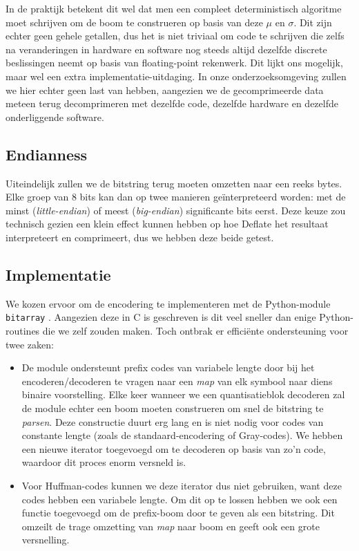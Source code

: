 \begin{itemize}
In de praktijk betekent dit wel dat men een compleet deterministisch algoritme moet schrijven om de boom te construeren op basis van deze $\mu$ en $\sigma$. Dit zijn echter geen gehele getallen, dus het is niet triviaal om code te schrijven die zelfs na veranderingen in hardware en software nog steeds altijd dezelfde discrete beslissingen neemt op basis van floating-point rekenwerk. Dit lijkt ons mogelijk, maar wel een extra implementatie-uitdaging. In onze onderzoeksomgeving zullen we hier echter geen last van hebben, aangezien we de gecomprimeerde data meteen terug decomprimeren met dezelfde code, dezelfde hardware en dezelfde onderliggende software.

\end{itemize}

\subsection{Endianness}

Uiteindelijk zullen we de bitstring terug moeten omzetten naar een reeks bytes. Elke groep van 8 bits kan dan op twee manieren ge\"interpreteerd worden: met de minst (\textit{little-endian}) of meest (\textit{big-endian}) significante bits eerst. Deze keuze zou technisch gezien een klein effect kunnen hebben op hoe Deflate het resultaat interpreteert en comprimeert, dus we hebben deze beide getest.

\subsection{Implementatie}

We kozen ervoor om de encodering te implementeren met de Python-module \texttt{bitarray} \cite{ref:bitarray}. Aangezien deze in C is geschreven is dit veel sneller dan enige Python-routines die we zelf zouden maken. Toch ontbrak er effici\"ente ondersteuning voor twee zaken:

\begin{itemize}

\item De module ondersteunt prefix codes van variabele lengte \cite{ref:variable_length_code} door bij het encoderen/decoderen te vragen naar een \textit{map} van elk symbool naar diens binaire voorstelling. Elke keer wanneer we een quantisatieblok decoderen zal de module echter een boom moeten construeren om snel de bitstring te \textit{parsen}. Deze constructie duurt erg lang en is niet nodig voor codes van constante lengte (zoals de standaard-encodering of Gray-codes). We hebben een nieuwe iterator toegevoegd om te decoderen op basis van zo'n code, waardoor dit proces enorm versneld is.

\item Voor Huffman-codes \cite{ref:huffman_coding} kunnen we deze iterator dus niet gebruiken, want deze codes hebben een variabele lengte. Om dit op te lossen hebben we ook een functie toegevoegd om de prefix-boom door te geven als een bitstring. Dit omzeilt de trage omzetting van \textit{map} naar boom en geeft ook een grote versnelling.

\end{itemize}

